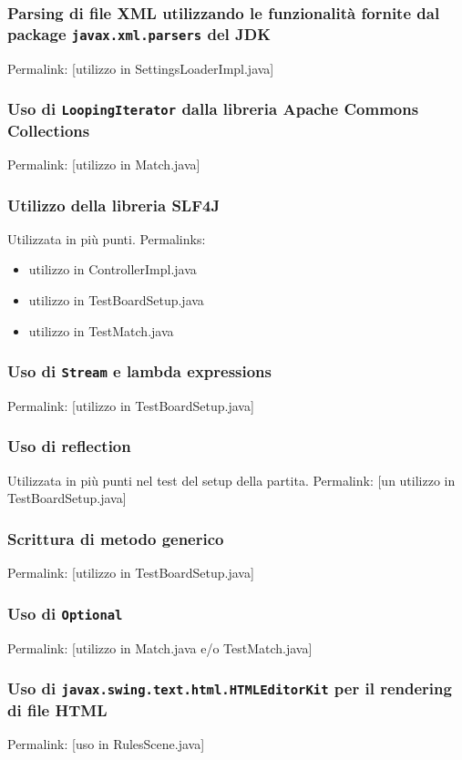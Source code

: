 \documentclass[a4paper,12pt]{report}
\begin{document}
\subsubsection{Parsing di file XML utilizzando le funzionalità fornite dal package \texttt{javax.xml.parsers} del JDK}
Permalink: [utilizzo in SettingsLoaderImpl.java]

\subsubsection{Uso di \texttt{LoopingIterator} dalla libreria Apache Commons Collections}
Permalink: [utilizzo in Match.java]

\subsubsection{Utilizzo della libreria SLF4J}
Utilizzata in più punti. Permalinks:
\begin{itemize}
	\item utilizzo in ControllerImpl.java
	\item utilizzo in TestBoardSetup.java
	\item utilizzo in TestMatch.java
\end{itemize}

\subsubsection{Uso di \texttt{Stream} e lambda expressions}
Permalink: [utilizzo in TestBoardSetup.java]

\subsubsection{Uso di reflection}
Utilizzata in più punti nel test del setup della partita.
Permalink: [un utilizzo in TestBoardSetup.java]

\subsubsection{Scrittura di metodo generico}
Permalink: [utilizzo in TestBoardSetup.java]

\subsubsection{Uso di \texttt{Optional}}
Permalink: [utilizzo in Match.java e/o TestMatch.java]

\subsubsection{Uso di \texttt{javax.swing.text.html.HTMLEditorKit} per il rendering di file HTML}
Permalink: [uso in RulesScene.java]
\end{document}
